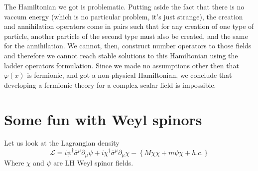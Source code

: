\documentclass{article}
\let\breaklesssection\section
\renewcommand\section{\clearpage\breaklesssection}
\begin{document}
The Hamiltonian we got is problematic. Putting aside the fact that there is no vaccum energy (which is no particular problem, it's just strange), the creation and annihilation operators come in pairs such that for any creation of one type of particle, another particle of the second type must also be created, and the same for the annihilation. We cannot, then, construct number operators to those fields and therefore we cannot reach stable solutions to this Hamiltonian using the ladder operators formulation. Since we made no assumptions other then that $\varphi(x)$ is fermionic, and got a non-physical Hamiltonian, we conclude that developing a fermionic theory for a complex scalar field is impossible.

\section{Some fun with Weyl spinors}
Let us look at the Lagrangian density
\begin{equation}
\label{eq:spinors-lagrangian-density}
    \mathcal{L} = i\psi^{\dagger}\bar{\sigma}^\mu\partial_\mu\psi + i\chi^{\dagger}\bar{\sigma}^\mu\partial_\mu\chi - \left\{M\chi\chi + m\psi\chi + h.c.\right\}
\end{equation}
Where $\chi$ and $\psi$ are LH Weyl spinor fields.
\end{document}
